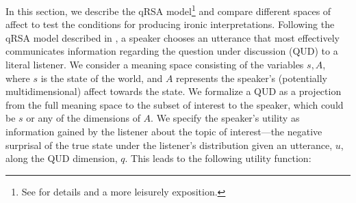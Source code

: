 \documentclass[10pt,letterpaper]{article}
\begin{document}
%
%

In this section, we describe the qRSA model\footnote{See  for details and a more leisurely exposition.} and compare different spaces of affect to test the conditions for producing ironic interpretations. 
%
%
%
Following the qRSA model described in , a speaker chooses an utterance that most effectively communicates information regarding the question under discussion (QUD) to a literal listener. We consider a meaning space consisting of the variables $s, A$, where $s$ is the state of the world, and $A$ represents the speaker's (potentially multidimensional) affect towards the state. %
We formalize a QUD as a projection from the full meaning space to the subset of interest to the speaker, which could be $s$ or any of the dimensions of $A$. 
We specify the speaker's utility as information gained by the listener about the topic of interest---the negative surprisal of the true state under the listener's distribution given an utterance, $u$, along the QUD dimension, $q$. This leads to the following utility function: 
\end{document}
